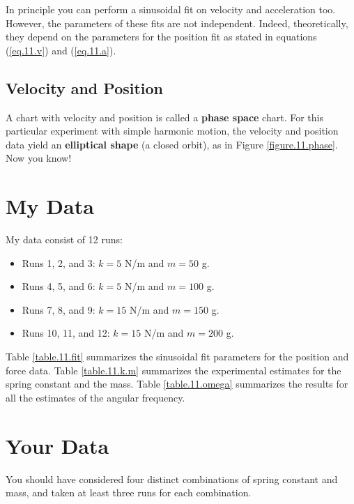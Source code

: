 In principle you can perform a sinusoidal fit on velocity and acceleration too. However, the parameters of these fits are not independent. Indeed, theoretically, they depend on the parameters for the position fit as stated in equations (\ref{eq.11.v}) and (\ref{eq.11.a}).
%
\subsection{Velocity and Position}
%
A chart with velocity and position is called a \textbf{phase space} chart. For this particular experiment with simple harmonic motion, the velocity and position data yield an \textbf{elliptical shape} (a closed orbit), as in Figure \ref{figure.11.phase}. Now you know!
%
\section{My Data}
%
My data consist of 12 runs:
\begin{itemize}
    \item Runs 1, 2, and 3: $k = 5$ N/m and $m = 50$ g.
    \item Runs 4, 5, and 6: $k = 5$ N/m and $m = 100$ g.
    \item Runs 7, 8, and 9: $k = 15$ N/m and $m = 150$ g.
    \item Runs 10, 11, and 12: $k = 15$ N/m and $m = 200$ g.
\end{itemize}
Table \ref{table.11.fit} summarizes the sinusoidal fit parameters for the position and force data. Table \ref{table.11.k.m} summarizes the experimental estimates for the spring constant and the mass. Table \ref{table.11.omega} summarizes the results for all the estimates of the angular frequency.
%
\section{Your Data}
%
You should have considered four distinct combinations of spring constant and mass, and taken at least three runs for each combination.
%
\newpage
